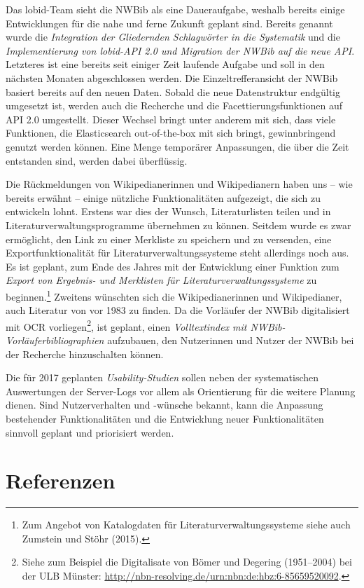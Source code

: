 \documentclass[a4paper,
fontsize=11pt,
oneside,
numbers=noperiodatend,
parskip=half-,
bibliography=totoc,
final
]{scrartcl}
\begin{document}
Das lobid-Team sieht die NWBib als eine Daueraufgabe, weshalb bereits
einige Entwicklungen für die nahe und ferne Zukunft geplant sind.
Bereits genannt wurde die \emph{Integration der Gliedernden Schlagwörter
in die Systematik} und die \emph{Implementierung von lobid-API 2.0 und
Migration der NWBib auf die neue API}. Letzteres ist eine bereits seit
einiger Zeit laufende Aufgabe und soll in den nächsten Monaten
abgeschlossen werden. Die Einzeltrefferansicht der NWBib basiert bereits
auf den neuen Daten. Sobald die neue Datenstruktur endgültig umgesetzt
ist, werden auch die Recherche und die Facettierungsfunktionen auf API
2.0 umgestellt. Dieser Wechsel bringt unter anderem mit sich, dass viele
Funktionen, die Elasticsearch out-of-the-box mit sich bringt,
gewinnbringend genutzt werden können. Eine Menge temporärer Anpassungen,
die über die Zeit entstanden sind, werden dabei überflüssig.

Die Rückmeldungen von Wikipedianerinnen und Wikipedianern haben uns --
wie bereits erwähnt -- einige nützliche Funktionalitäten aufgezeigt, die
sich zu entwickeln lohnt. Erstens war dies der Wunsch, Literaturlisten
teilen und in Literaturverwaltungsprogramme übernehmen zu können.
Seitdem wurde es zwar ermöglicht, den Link zu einer Merkliste zu
speichern und zu versenden, eine Exportfunktionalität für
Literaturverwaltungssysteme steht allerdings noch aus. Es ist geplant,
zum Ende des Jahres mit der Entwicklung einer Funktion zum \emph{Export
von Ergebnis- und Merklisten für Literaturverwaltungssysteme} zu
beginnen.\footnote{Zum Angebot von Katalogdaten für
  Literaturverwaltungssysteme siehe auch Zumstein und Stöhr (2015).}
Zweitens wünschten sich die Wikipedianerinnen und Wikipedianer, auch
Literatur von vor 1983 zu finden. Da die Vorläufer der NWBib
digitalisiert mit OCR vorliegen\footnote{Siehe zum Beispiel die
  Digitalisate von Bömer und Degering (1951--2004) bei der ULB Münster:
  \url{http://nbn-resolving.de/urn:nbn:de:hbz:6-85659520092}.}, ist
geplant, einen \emph{Volltextindex mit NWBib-Vorläuferbibliographien}
aufzubauen, den Nutzerinnen und Nutzer der NWBib bei der Recherche
hinzuschalten können.

Die für 2017 geplanten \emph{Usability-Studien} sollen neben der
systematischen Auswertungen der Server-Logs vor allem als Orientierung
für die weitere Planung dienen. Sind Nutzerverhalten und -wünsche
bekannt, kann die Anpassung bestehender Funktionalitäten und die
Entwicklung neuer Funktionalitäten sinnvoll geplant und priorisiert
werden.

\section*{Referenzen}\label{referenzen}
\end{document}
